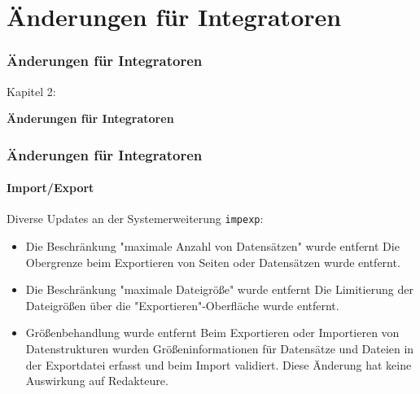 %

\section{Änderungen für Integratoren}
\begin{frame}[fragile]
	\frametitle{Änderungen für Integratoren}

	\begin{center}\huge{Kapitel 2:}\end{center}
	\begin{center}\huge{\color{typo3darkgrey}\textbf{Änderungen für Integratoren}}\end{center}

\end{frame}


\begin{frame}[fragile]
	\frametitle{Änderungen für Integratoren}
	\framesubtitle{Import/Export}

	Diverse Updates an der Systemerweiterung \texttt{impexp}:

	\begin{itemize}
		\item Die Beschränkung "maximale Anzahl von Datensätzen" wurde entfernt\newline
			\smaller
				Die Obergrenze beim Exportieren von Seiten oder Datensätzen wurde entfernt.
			\normalsize

		\item Die Beschränkung "maximale Dateigröße" wurde entfernt\newline
			\smaller
				Die Limitierung der Dateigrößen über die
				"Exportieren"-Oberfläche wurde entfernt.
			\normalsize

		\item Größenbehandlung wurde entfernt\newline
			\smaller
				Beim Exportieren oder Importieren von Datenstrukturen wurden Größeninformationen für     
				Datensätze und Dateien in der Exportdatei erfasst und beim Import validiert.
				Diese Änderung hat keine Auswirkung auf Redakteure.
			\normalsize
	\end{itemize}

\end{frame}

